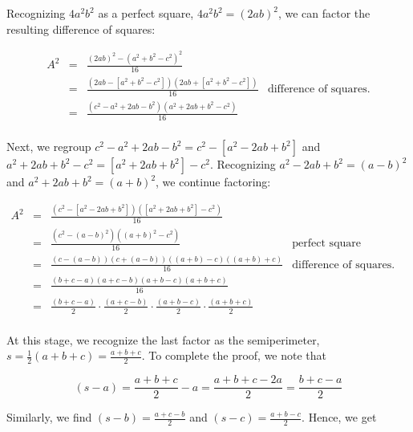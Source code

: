 \documentclass{ximera}
\begin{document}
	
Recognizing $4a^2 b^2$ as a perfect square, $4a^2 b^2 = (2ab)^2$, we can factor the resulting difference of squares:
		
\[ \begin{array}{rclr}
	 
	 	
	A^2 	& = & \frac{(2ab)^2  - \left(a^2 + b^2 - c^2\right)^2}{16}  &  \\  
	 	
	 		& = & \frac{\left( 2ab - \left[a^2+b^2 - c^2\right]\right)  \left( 2ab + \left[a^2+b^2 - c^2\right]\right)}{16}  & \text{difference of squares.} \\  
	 	 	& = & \frac{\left(c^2 - a^2 + 2ab - b^2 \right)\left( a^2 + 2ab + b^2- c^2\right)}{16}  &  \\  
	 	\end{array} \]
		
Next, we regroup $c^2 - a^2 + 2ab - b^2 = c^2 - \left[a^2 - 2ab + b^2\right]$ and  $a^2 + 2ab + b^2- c^2 = \left[a^2 + 2ab + b^2\right]- c^2$.  Recognizing $a^2 - 2ab + b^2 = (a-b)^2$ and $a^2 + 2ab + b^2 = (a+b)^2$, we continue factoring:
	 	
\[ \begin{array}{rclr}

A^2	& = & \frac{\left(c^2 - \left[a^2 - 2ab + b^2\right] \right)  \left( \left[a^2 + 2ab + b^2\right]- c^2\right)}{16}  &  \\  

	 	& = & \frac{\left(c^2 - (a-b)^2 \right)  \left( (a+b)^2- c^2\right)}{16}  &  \text{perfect square trinomials.}\\  
	 	
	 	& = & \frac{ (c-(a-b))(c+(a-b))((a+b) -c)((a+b)+c)}{16}  &  \text{difference of squares.} \\  
	 			 
	 	& = & \frac{ (b+c-a)(a+c-b)(a+b-c)(a+b+c)}{16}  &  \\  	 	
	 	
	  & = & \frac{(b+c-a)}{2} \cdot \frac{(a+c-b)}{2} \cdot \frac{(a+b-c)}{2} \cdot \frac{(a+b+c)}{2}  &  \\  	 
	 		
\end{array} \]

At this stage, we recognize the last factor as the semiperimeter, $s = \frac{1}{2}(a+b+c) = \frac{a+b+c}{2}$.  To complete the proof, we note that

\[ (s - a) = \frac{a+b+c}{2} - a = \frac{a+b+c-2a}{2} = \frac{b+c-a}{2} \]  
			
Similarly, we find $(s-b) = \frac{a+c-b}{2}$ and $(s-c) = \frac{a+b-c}{2}$.  Hence, we get
\end{document}
